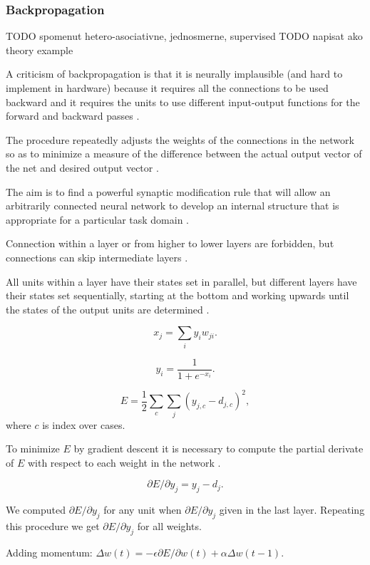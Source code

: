 \subsubsection{Backpropagation}
\label{models-bp} 

TODO spomenut hetero-asociativne, jednosmerne, supervised 
TODO napisat ako theory example

A criticism of backpropagation is that it is neurally implausible (and hard to implement in hardware) because it requires all the connections to be used backward and it requires the units to use different input-output functions for the forward and backward passes \citet{hinton1988learning}.

The procedure repeatedly adjusts the weights of the connections in the network so as to minimize a measure of the difference between the actual output vector of the net and desired output vector \citet{rumelhart1986learning}. 

The aim is to find a powerful synaptic modification rule that will allow an arbitrarily connected neural network to develop an internal structure that is appropriate for a particular task domain \citet{rumelhart1986learning}. 

Connection within a layer or from higher to lower layers are forbidden, but connections can skip intermediate layers \citet{rumelhart1986learning}.

All units within a layer have their states set in parallel, but different layers have their states set sequentially, starting at the bottom and working upwards until the states of the output units are determined \citet{rumelhart1986learning}. 

$$x_j = \sum_i y_iw_{ji}.$$

$$y_i = \frac{1}{1 + e^{-x_i}}.$$

$$E = \frac{1}{2} \sum_c \sum_j (y_{j,c} - d_{j,c})^2,$$
where $c$ is index over cases. 

To minimize $E$ by gradient descent it is necessary to compute the partial derivate of $E$ with respect to each weight in the network \citet{rumelhart1986learning}. 

$$\partial E / \partial y_j = y_j - d_j.$$

We computed $\partial E / \partial y_j$ for any unit when $\partial E / \partial y_j$ given in the last layer. Repeating this procedure we get $\partial E / \partial y_j$ for all weights. 

Adding momentum:
$\Delta w(t) = -\epsilon \partial E/ \partial w(t) + \alpha \Delta w(t-1).$

